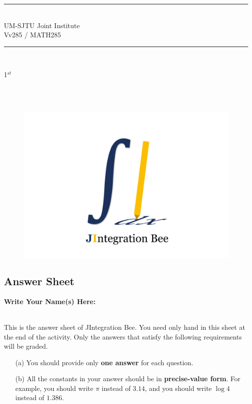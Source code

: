 \documentclass[12pt]{article}
\begin{document}
    \vspace{10cm}
    \begin{center}
        \rule{15cm}{0.01cm}
        \\\LARGE{
            UM-SJTU Joint Institute
            \\Vv285 / MATH285
          }
        \\\rule{15cm}{0.01cm}
        \\\vspace{6cm}
         \begin{Huge}
            1$^{st}$
        \end{Huge}
        \begin{Huge}
            \\
            \\
        \end{Huge}
    \end{center}
    \begin{figure}[H]
        \center
        \includegraphics[width = 0.8\linewidth]{Figure/Logo.png}
    \end{figure}
    \vfill
    \flushleft
    \begin{center}
    \end{center}

\setlength{\parindent}{1em}
\newpage
\thispagestyle{empty}
\setcounter{page}{1}

\begin{center}
    \section*{Answer Sheet}
\end{center}
\textbf{Write Your Name(s) Here: }
\\~
\par This is the answer sheet of JIntegration Bee. You need only hand in this sheet at the end of the activity. Only the answers that satisfy the following requirements will be graded. 
\begin{itemize}
    \item [(a)] You should provide only \textbf{one answer} for each question. 
    \item [(b)] All the constants in your answer should be in \textbf{precise-value form}. For example, you should write $\pi$ instead of $3.14$, and you should write $ \log 4$ instead of $1.386$. 
\end{itemize} 
\end{document}
